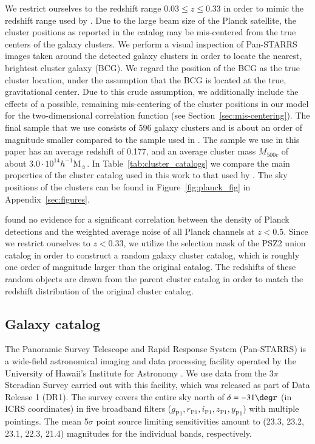 \documentclass[iop, apjl, twocolappendix, numberedappendix]{emulateapj}
\begin{document}
We restrict ourselves to the redshift range $0.03 \leq z \leq 0.33$
in order to mimic the redshift range used by
\citet{more2016detection}. Due to the large beam size of the Planck
satellite, the cluster positions as reported in the catalog may be
mis-centered from the true centers of the galaxy clusters. We perform
a visual inspection of Pan-STARRS images taken around the detected
galaxy clusters in order to locate the nearest, brightest cluster
galaxy (BCG). We regard the position of the BCG as the true cluster
location, under the assumption that the BCG is located at the true,
gravitational center. Due to this crude assumption, we additionally 
include the effects of a possible, remaining mis-centering of the 
cluster positions in our model for the two-dimensional correlation 
function (see Section~\ref{sec:mis-centering}). 
The final sample that we use consists of 596
galaxy clusters and is about an order of magnitude smaller compared
to the sample used in \citet{more2016detection}. The sample we use
in this paper has an average redshift of 0.177, and an average
cluster mass $M_{500c}$ of about $3.0 \cdot 10^{14}
h^{-1}$M$_{\sun}$. In Table~\ref{tab:cluster_catalogs} we compare
the main properties of the cluster catalog used in this work to that
used by \citet{more2016detection}. The sky positions of the clusters
can be found in Figure~\ref{fig:planck_fig} in
Appendix~\ref{sec:figures}. 

\citet{kosyra2015environment} found no evidence for a significant
correlation between the density of Planck detections and the
weighted average noise of all Planck channels at $z<0.5$. Since we
restrict ourselves to $z<0.33$, we utilize the selection mask of the
PSZ2 union catalog in order to construct a random galaxy cluster
catalog, which is roughly one order of magnitude larger than the
original catalog. The redshifts of these random objects are drawn
from the parent cluster catalog in order to match the redshift
distribution of the original cluster catalog. 

\subsection{Galaxy catalog}
\label{sec:galaxies}
The Panoramic Survey Telescope and Rapid Response System
(Pan-STARRS) is a wide-field astronomical imaging and data
processing facility operated by the University of Hawaii's Institute
for Astronomy \citep{kaiser2002pan,kaiser2010pan}. We use data from
the 3$\pi$ Steradian Survey carried out with this facility, which
was released as part of Data Release 1 (DR1). The survey covers the
entire sky north of $\delta=-31\degr$ (in ICRS coordinates) in five
broadband filters ($g_{\mathrm{P1}}, r_{\mathrm{P1}},
i_{\mathrm{P1}}, z_{\mathrm{P1}}, y_{\mathrm{P1}}$) with multiple
pointings. The mean 5$\sigma$ point source limiting sensitivities
amount to (23.3, 23.2, 23.1, 22.3, 21.4) magnitudes for the
individual bands, respectively. 
\end{document}
